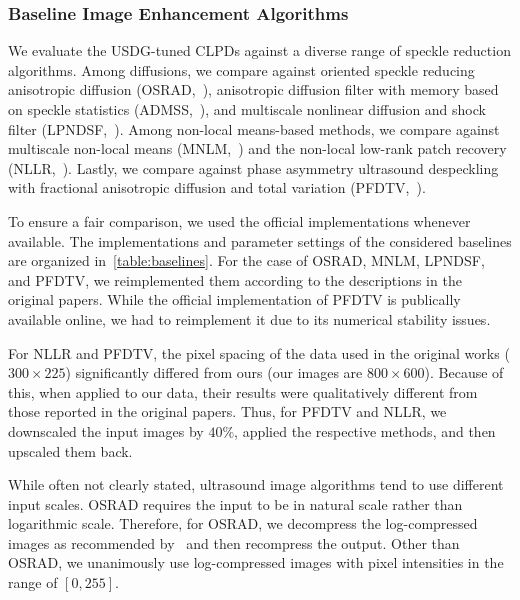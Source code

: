 \subsubsection{Baseline Image Enhancement Algorithms}\label{section:baseline}
We evaluate the USDG-tuned CLPDs against a diverse range of speckle reduction algorithms.
Among diffusions, we compare against oriented speckle reducing anisotropic diffusion (OSRAD,~\cite{krissian_oriented_2007}), anisotropic diffusion filter with memory based on speckle statistics (ADMSS,~\cite{ramos-llorden_anisotropic_2015}), and multiscale nonlinear diffusion and shock filter (LPNDSF,~\cite{zhang_multiscale_2006}).
Among non-local means-based methods, we compare against multiscale non-local means (MNLM,~\cite{breivik_realtime_2017}) and the non-local low-rank patch recovery (NLLR,~\cite{zhu_nonlocal_2017}).
Lastly, we compare against phase asymmetry ultrasound despeckling with fractional anisotropic diffusion and total variation (PFDTV,~\cite{mei_phase_2020}).

To ensure a fair comparison, we used the official implementations whenever available.
The implementations and parameter settings of the considered baselines are organized in~\cref{table:baselines}.
For the case of OSRAD, MNLM, LPNDSF, and PFDTV, we reimplemented them according to the descriptions in the original papers.
While the official implementation of PFDTV is publically available online, we had to reimplement it due to its numerical stability issues.

For NLLR and PFDTV, the pixel spacing of the data used in the original works (\(300 \times 225\)) significantly differed from ours (our images are \(800 \times 600\)).
Because of this, when applied to our data, their results were qualitatively different from those reported in the original papers.
Thus, for PFDTV and NLLR, we downscaled the input images by \(40\%\), applied the respective methods, and then upscaled them back.

While often not clearly stated, ultrasound image algorithms tend to use different input scales.
OSRAD requires the input to be in natural scale rather than logarithmic scale.
Therefore, for OSRAD, we decompress the log-compressed images as recommended by~\cite{yongjianyu_generalized_2004} and then recompress the output.
Other than OSRAD, we unanimously use log-compressed images with pixel intensities in the range of \([0, 255]\).

